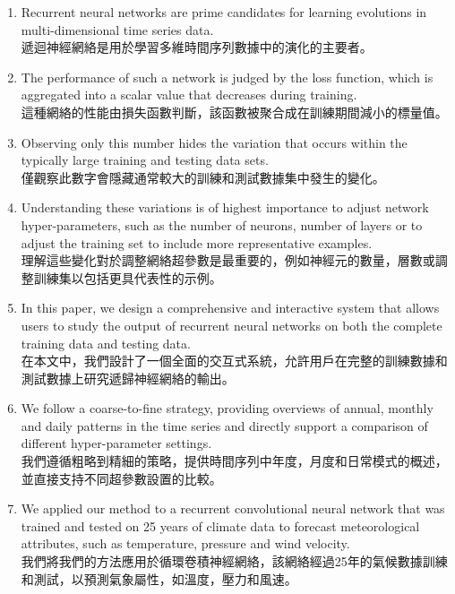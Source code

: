 \begin{enumerate}

\item Recurrent neural networks are prime candidates for learning evolutions in multi-dimensional time series data. \\
遞迴神經網絡是用於學習多維時間序列數據中的演化的主要者。\\

\item The performance of such a network is judged by the loss function, which is aggregated into a scalar value that decreases during training. \\
這種網絡的性能由損失函數判斷，該函數被聚合成在訓練期間減小的標量值。\\

\item Observing only this number hides the variation that occurs within the typically large training and testing data sets. \\
僅觀察此數字會隱藏通常較大的訓練和測試數據集中發生的變化。\\

\item Understanding these variations is of highest importance to adjust network hyper-parameters, such as the number of neurons, number of layers or to adjust the training set to include more representative examples. \\
理解這些變化對於調整網絡超參數是最重要的，例如神經元的數量，層數或調整訓練集以包括更具代表性的示例。\\

\item In this paper, we design a comprehensive and interactive system that allows users to study the output of recurrent neural networks on both the complete training data and testing data. \\
在本文中，我們設計了一個全面的交互式系統，允許用戶在完整的訓練數據和測試數據上研究遞歸神經網絡的輸出。\\

\item We follow a coarse-to-fine strategy, providing overviews of annual, monthly and daily patterns in the time series and directly support a comparison of different hyper-parameter settings. \\
我們遵循粗略到精細的策略，提供時間序列中年度，月度和日常模式的概述，並直接支持不同超參數設置的比較。\\

\item We applied our method to a recurrent convolutional neural network that was trained and tested on 25 years of climate data to forecast meteorological attributes, such as temperature, pressure and wind velocity. \\
我們將我們的方法應用於循環卷積神經網絡，該網絡經過25年的氣候數據訓練和測試，以預測氣象屬性，如溫度，壓力和風速。\\


\end{enumerate}
